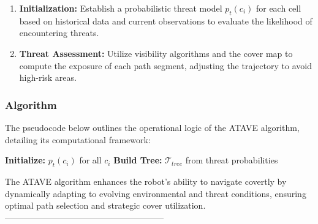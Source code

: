 \begin{enumerate}
    \item \textbf{Initialization:} Establish a probabilistic threat model $p_t(c_i)$ for each cell based on historical data and current observations to evaluate the likelihood of encountering threats.
    \item \textbf{Threat Assessment:} Utilize visibility algorithms and the cover map to compute the exposure of each path segment, adjusting the trajectory to avoid high-risk areas.
\end{enumerate}

\subsubsection{Algorithm}
The pseudocode below outlines the operational logic of the ATAVE algorithm, detailing its computational framework:

\begin{algorithm}
\caption{Adaptive Threat-Aware Visibility Estimation (ATAVE)}
\label{alg:atave}
\SetAlgoLined
{}

\textbf{Initialize:} $p_t(c_i)$ for all $c_i$\;
\textbf{Build Tree:} $\mathcal{T}_{tree}$ from threat probabilities\;


\end{algorithm}

The ATAVE algorithm enhances the robot’s ability to navigate covertly by dynamically adapting to evolving environmental and threat conditions, ensuring optimal path selection and strategic cover utilization.
--------------------------------------------------------

